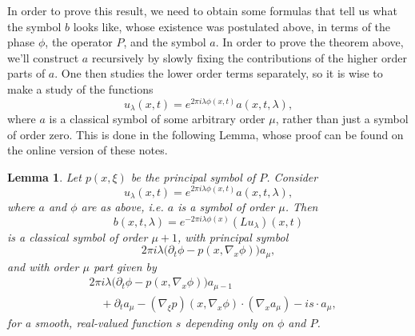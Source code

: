 \documentclass{article}
\theoremstyle{plain}
\newtheorem{lemma}[theorem]{Lemma}
\theoremstyle{remark}
\theoremstyle{definition}
\begin{document}
In order to prove this result, we need to obtain some formulas that tell us what the symbol $b$ looks like, whose existence was postulated above, in terms of the phase $\phi$, the operator $P$, and the symbol $a$. In order to prove the theorem above, we'll construct $a$ recursively by slowly fixing the contributions of the higher order parts of $a$. One then studies the lower order terms separately, so it is wise to make a study of the functions
%
\[ u_\lambda(x,t) = e^{2 \pi i \lambda \phi(x,t)} a(x,t,\lambda),\]
%
where $a$ is a classical symbol of some arbitrary order $\mu$, rather than just a symbol of order zero. This is done in the following Lemma, whose proof can be found on the online version of these notes.

\begin{lemma}
	Let $p(x,\xi)$ be the principal symbol of $P$. Consider
	\[ u_\lambda(x,t) = e^{2 \pi i \lambda \phi(x,t)} a(x,t,\lambda), \]
	where $a$ and $\phi$ are as above, i.e. $a$ is a symbol of order $\mu$. Then
	\[ b(x,t,\lambda) = e^{-2 \pi i \lambda \phi(x)} (L u_\lambda)(x,t) \]
	is a classical symbol of order $\mu+1$, with principal symbol
	\[ 2\pi i \lambda \Big( \partial_t \phi - p \left( x, \nabla_x \phi \right) \Big) a_\mu, \]
	and with order $\mu$ part given by
	\begin{align*}
		&2 \pi i \lambda \Big( \partial_t \phi - p \left( x, \nabla_x \phi \right) \Big) a_{\mu - 1}\\
		&\quad + \partial_t a_\mu -  (\nabla_\xi p)(x, \nabla_x \phi) \cdot (\nabla_x a_\mu) - i s \cdot a_\mu,
	\end{align*}
	for a smooth, real-valued function $s$ depending only on $\phi$ and $P$.
\end{lemma}
\end{document}
